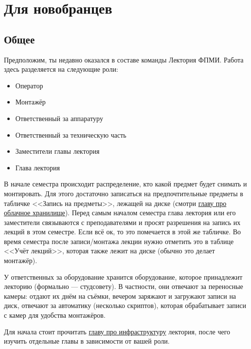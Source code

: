 \section{Для новобранцев}\label{sec:for-newcomers}

\subsection{Общее}

Предположим, ты недавно оказался в составе команды Лектория ФПМИ. Работа здесь разделяется на следующие роли:

\begin{itemize}
  \item Оператор
  \item Монтажёр
  \item Ответственный за аппаратуру
  \item Ответственный за техническую часть
  \item Заместители главы лектория
  \item Глава лектория
\end{itemize}

В начале семестра происходит распределение, кто какой предмет будет снимать и монтировать. Для этого достаточно записаться на предпочтительные предметы в табличке <<Запись на предметы>>, лежащей на диске (смотри \hyperref[sec:cloud-storage]{главу про облачное хранилище}). Перед самым началом семестра глава лектория или его заместители связываются с преподавателями и просят разрешения на запись их лекций в этом семестре. Если всё ок, то это помечается в этой же табличке. Во время семестра после записи/монтажа лекции нужно отметить это в таблице <<Учёт лекций>>, которая также лежит на диске (обычно это делает монтажёр).

У ответственных за оборудование хранится оборудование, которое принадлежит лекторию (формально --- студсовету). В частности, они отвечают за переносные камеры: отдают их днём на съёмки, вечером заряжают и загружают записи на диск, отвечают за автоматику (несколько скриптов), которая обрабатывает записи с камер для удобства монтажёров.

Для начала стоит прочитать \hyperref[sec:infrastructure]{главу про инфраструктуру} лектория, после чего изучить отдельные главы в зависимости от вашей роли.

